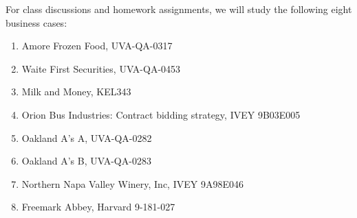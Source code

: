 \documentclass[11pt]{article}
\begin{document}
For class discussions and homework assignments, we will study the following eight business cases: 
\begin{enumerate}
\item Amore Frozen Food, UVA-QA-0317
\item Waite First Securities, UVA-QA-0453
\item Milk and Money, KEL343
\item Orion Bus Industries: Contract bidding strategy, IVEY 9B03E005
\item Oakland A's A, UVA-QA-0282
\item Oakland A's B, UVA-QA-0283
\item Northern Napa Valley Winery, Inc, IVEY 9A98E046
\item Freemark Abbey, Harvard 9-181-027
\end{enumerate}

\end{document}

